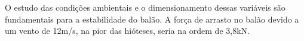     O estudo das condições ambientais e o dimensionamento dessas variáveis são fundamentais para a estabilidade do balão. A força de arrasto no balão devido a um vento de 12m/s, na pior das hióteses, seria na ordem de 3,8kN.

  
  
  
